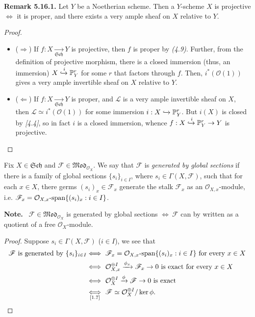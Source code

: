 \documentclass[11pt,a4paper,footinclude=true,headinclude=true]{scrbook} %
\newcommand{\FF}{\mathscr{F}}
\newcommand{\LL}{\mathscr{L}}
\newcommand{\OO}{\mathcal{O}}
\newcommand{\PP}{\mathbb{P}}
\newcommand{\Sch}{\mathfrak{Sch}}
\newcommand{\<}{\langle}
\newcommand{\>}{\rangle}
\newcommand{\spn}{\mathchar`-\mathrm{span}}
\newcommand{\MOD}{\mathfrak{Mod}}
\newenvironment{definition*}[2][Definition]
    { \begin{mdframed}[backgroundcolor=blue!20] \textbf{#1.}\ }
    {  \end{mdframed}}
\newenvironment{remark}[2][Remark]
    { \begin{mdframed}[backgroundcolor=gray!20] \textbf{#1 #2.} }
    {  \end{mdframed}}
\newenvironment{nt}[2][Note]
    { \begin{mdframed}[backgroundcolor=gray!20] \textbf{#1.}\ }
    {  \end{mdframed}}
\begin{document}
\begin{remark}{5.16.1}
    Let $Y$ be a Noetherian scheme. Then a $Y$-scheme $X$ is projective $\Longleftrightarrow$ it is proper, and there exists a very ample sheaf on $X$ relative to $Y$.
\end{remark}
\begin{proof}\mbox{}
    \begin{itemize}
        \item ($\Rightarrow$) If $f:X\xrightarrow[\Sch]{} Y$ is projective, then $f$ is proper by \textit{(4.9)}. Further, from the definition of projective morphism, there is a closed immersion (thus, an immersion) $X\xhookrightarrow{i}\PP_Y^r$ for some $r$ that factors through $f$. Then, $i^\ast(\OO(1))$ gives a very ample invertible sheaf on $X$ relative to $Y$.
        \item ($\Leftarrow$) If $f:X\xrightarrow[\Sch]{} Y$ is proper, and $\LL$ is a very ample invertible sheaf on $X$, then $\LL\simeq i^\ast(\OO(1))$ for some immersion $i:X\xhookrightarrow{}\PP_Y^r$. But $i(X)$ is closed by \textit{[4.4]}, so in fact $i$ is a closed immersion, whence $f:X\xhookrightarrow{i}\PP_Y^r\to Y$ is projective.
    \end{itemize} 
\end{proof}

\begin{definition*}{}
    Fix $X\in\Sch$ and $\FF\in\MOD_{\OO_X}$. We say that $\FF$ is \textit{generated by global sections} if there is a family of global sections $\{s_i\}_{i\in I}$, where $s_i\in\Gamma(X,\FF)$, such that for each $x\in X$, there germs $(s_i)_x\in\FF_x$ generate the stalk $\FF_x$ as an $\OO_{X,x}$-module, i.e. $\FF_x=\OO_{X,x}\spn\{(s_i)_x:i\in I\}$.
\end{definition*}

\begin{nt}{}
    $\FF\in\MOD_{\OO_X}$ is generated by global sections $\Longleftrightarrow\ \FF$ can by written as a quotient of a free $\OO_X$-module.
\end{nt}
\begin{proof}
    Suppose $s_i\in\Gamma(X,\FF)$ ($i\in I$), we see that
    \begin{align*}
        \FF\ \text{is generated by}\ \{s_i\}_{i\in I}
        &\Longleftrightarrow\ \FF_x=\OO_{X,x}\spn\{(s_i)_x:i\in I\}\ \text{for every}\ x\in X\\ &\Longleftrightarrow\ \OO_{X,x}^{\oplus I}\xrightarrow[]{\phi_x}\FF_x\to0\ \text{is exact for every}\ x\in X\\ &\Longleftrightarrow\ \OO_X^{\oplus I}\xrightarrow[]{\phi}\FF\to0\ \text{is exact}\\ &\underset{[1.7]}{\Longleftrightarrow}\ \FF\simeq\OO_X^{\oplus I}/\ker\phi.
    \end{align*}
\end{proof}
\end{document}
